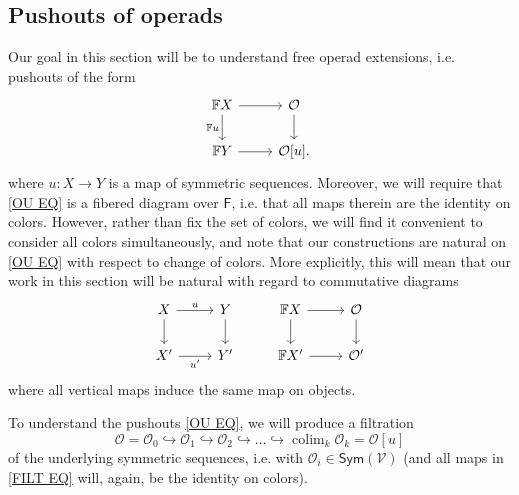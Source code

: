 \documentclass[a4paper,10pt
,draft
]{article}%
\numberwithin{equation}{section}
\numberwithin{figure}{section}
\theoremstyle{definition} %
\newcommand{\into}{\hookrightarrow}%
\DeclareMathOperator{\colim}{colim}%
\renewcommand{\O}{\ensuremath{\mathcal O}}
\newcommand{\1}{\ensuremath{\mathbbm 1}}%
\begin{document}





\subsection{Pushouts of operads}
\label{PUSHOUT_SEC}


Our goal in this section will be to understand free operad extensions, i.e. pushouts of the form 
\begin{equation}\label{OU EQ}
            \begin{tikzcd}
                  \mathbb F X \arrow[d, "\mathbb{F}u"'] \arrow[r]
                  &
                  \O \arrow[d]
                  \\
                  \mathbb F Y \arrow[r]
                  &
                  \O[u].
            \end{tikzcd}
\end{equation}
where $u \colon X \to Y$ is a map of symmetric sequences.
Moreover, we will require that \eqref{OU EQ} is a fibered diagram over $\mathsf{F}$, i.e. that all maps therein are the identity on colors.
However, rather than fix the set of colors, 
we will find it convenient to consider all colors simultaneously, 
and note that our constructions are natural 
on \eqref{OU EQ} with respect to change of colors.
More explicitly, this will mean that our work in this section will be natural with regard to commutative diagrams
\begin{equation}\label{COLORCHNAT EQ}
	\begin{tikzcd}
		X \arrow[r, "u"',swap] \arrow[d]
	&
		Y \arrow[d]
&
		\mathbb F X \arrow[d] \arrow[r]
	&
		\O \arrow[d]
\\
		X' \arrow[r, "u'"']
	&
		Y'
&
		\mathbb F X' \arrow[r]
	&
		\O'
	\end{tikzcd}
\end{equation}
where all vertical maps induce the same map on objects.


To understand the pushouts \eqref{OU EQ},
we will produce a filtration
\begin{equation}\label{FILT EQ}
      \O = \O_0 \into \O_1 \into \O_2 \into \dots \into \colim_k \O_k = \O[u]
\end{equation}
of the underlying symmetric sequences, i.e. with 
$\mathcal{O}_i \in \mathsf{Sym}(\mathcal{V})$
(and all maps in \eqref{FILT EQ} will, again, be the identity on colors).
\end{document}
